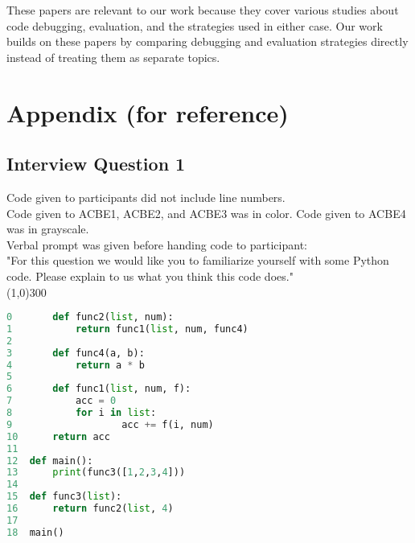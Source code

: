 \documentclass{article}
\begin{document}
These papers are relevant to our work because they cover various studies about code debugging, evaluation, and the strategies used in either case. Our work builds on these papers by comparing debugging and evaluation strategies directly instead of treating them as separate topics.

\newpage
\section{Appendix (for reference)}
\subsection{Interview Question 1} 
Code given to participants did not include line numbers. \\
Code given to ACBE1, ACBE2, and ACBE3 was in color. Code given to ACBE4 was in grayscale. \\
Verbal prompt was given before handing code to participant: \\
"For this question we would like you to familiarize yourself with some Python code.
Please explain to us what you think this code does." \\
\line(1,0){300}
\begin{lstlisting}[language=python]
0		def func2(list, num):
1			return func1(list, num, func4)
2
3		def func4(a, b):
4			return a * b
5
6		def func1(list, num, f):
7			acc = 0
8			for i in list:
9					acc += f(i, num)
10		return acc
11
12	def main():
13		print(func3([1,2,3,4]))
14
15	def func3(list):
16		return func2(list, 4)
17
18	main()

\end{lstlisting}
\newpage
\end{document}
